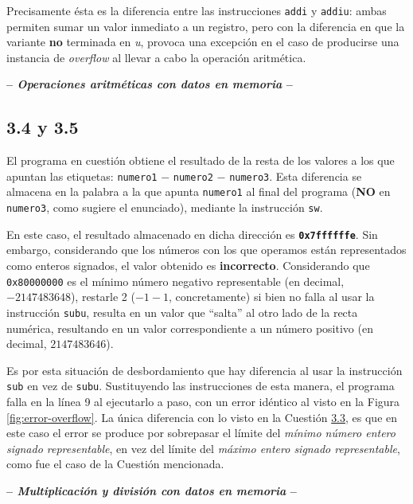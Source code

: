 \documentclass[a4paper]{report}
\begin{document}
Precisamente ésta es la diferencia entre las instrucciones \texttt{addi} y \texttt{addiu}: ambas permiten sumar un valor inmediato a un registro, pero con la diferencia en que la variante \textbf{no} terminada en \textit{u}, provoca una excepción en el caso de producirse una instancia de \textit{overflow} al llevar a cabo la operación aritmética.

\begin{center}
    \large\textbf{-- \textsl{Operaciones aritméticas con datos en memoria} --}
\end{center}

\subsection*{3.4 y 3.5}

El programa en cuestión obtiene el resultado de la resta de los valores a los que apuntan las etiquetas: \texttt{numero1} $-$ \texttt{numero2} $-$ \texttt{numero3}. Esta diferencia se almacena en la palabra a la que apunta \texttt{numero1} al final del programa (\textbf{NO} en \texttt{numero3}, como sugiere el enunciado), mediante la instrucción \texttt{sw}.

En este caso, el resultado almacenado en dicha dirección es \textbf{\texttt{0x7ffffffe}}. Sin embargo, considerando que los números con los que operamos están representados como enteros signados, el valor obtenido es \textbf{incorrecto}. Considerando que \texttt{0x80000000} es el mínimo número negativo representable (en decimal, $-2147483648$), restarle 2 ($-1-1$, concretamente) si bien no falla al usar la instrucción \texttt{subu}, resulta en un valor que ``salta'' al otro lado de la recta numérica, resultando en un valor correspondiente a un número positivo (en decimal, $2147483646$).

Es por esta situación de desbordamiento que hay diferencia al usar la instrucción \texttt{sub} en vez de \texttt{subu}. Sustituyendo las instrucciones de esta manera, el programa falla en la línea 9 al ejecutarlo a paso, con un error idéntico al visto en la Figura \ref{fig:error-overflow}. La única diferencia con lo visto en la Cuestión \hyperref[sec:c3-3]{3.3}, es que en este caso el error se produce por sobrepasar el límite del \textit{mínimo número entero signado representable}, en vez del límite del \textit{máximo entero signado representable}, como fue el caso de la Cuestión mencionada.

\begin{center}
    \large\textbf{-- \textsl{Multiplicación y división con datos en memoria} --}
\end{center}
\end{document}

